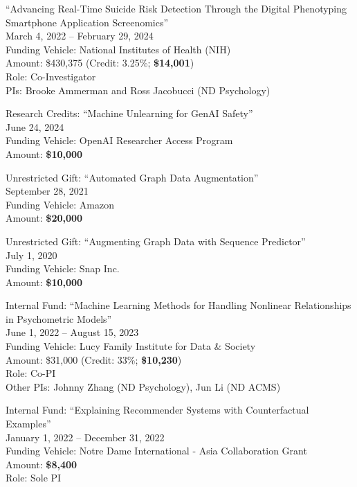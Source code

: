\documentclass[10pt]{article}
\newenvironment{myindentpar}[1]%
{\begin{list}{}%
         {\setlength{\leftmargin}{#1}}%
         \item[]%
}
{\end{list}}
\newcounter{list}
\begin{document}
\begin{myindentpar}{0.75cm}
\hspace{-0.75cm}``Advancing Real-Time Suicide Risk Detection Through the Digital Phenotyping Smartphone Application Screenomics'' \\
March 4, 2022 -- February 29, 2024 \\
Funding Vehicle: National Institutes of Health  (NIH) \\
Amount: \$430,375 (Credit: 3.25\%; \textbf{\$14,001}) \\
Role: {Co-Investigator} \\
PIs: Brooke Ammerman and Ross Jacobucci (ND Psychology)

\hspace{-0.75cm}Research Credits: ``Machine Unlearning for GenAI Safety''\\
June 24, 2024 \\
Funding Vehicle: OpenAI Researcher Access Program \\
Amount: \textbf{\$10,000}

\hspace{-0.75cm}Unrestricted Gift: ``Automated Graph Data Augmentation''\\
September 28, 2021 \\
Funding Vehicle: Amazon \\
Amount: \textbf{\$20,000}

\hspace{-0.75cm}Unrestricted Gift: ``Augmenting Graph Data with Sequence Predictor'' \\
July 1, 2020 \\
Funding Vehicle: Snap Inc. \\
Amount: \textbf{\$10,000}

\hspace{-0.75cm}Internal Fund: ``Machine Learning Methods for Handling Nonlinear Relationships in Psychometric Models'' \\
June 1, 2022 -- August 15, 2023 \\
Funding Vehicle: Lucy Family Institute for Data \& Society \\
Amount: \$31,000 (Credit: 33\%; \textbf{\$10,230}) \\
Role: {Co-PI} \\
Other PIs: Johnny Zhang (ND Psychology), Jun Li (ND ACMS)

\hspace{-0.75cm}Internal Fund: ``Explaining Recommender Systems with Counterfactual Examples''\\
January 1, 2022 -- December 31, 2022 \\
Funding Vehicle: Notre Dame International - Asia Collaboration Grant \\
Amount: \textbf{\$8,400} \\
Role: {Sole PI}


\end{myindentpar}
\end{document}
